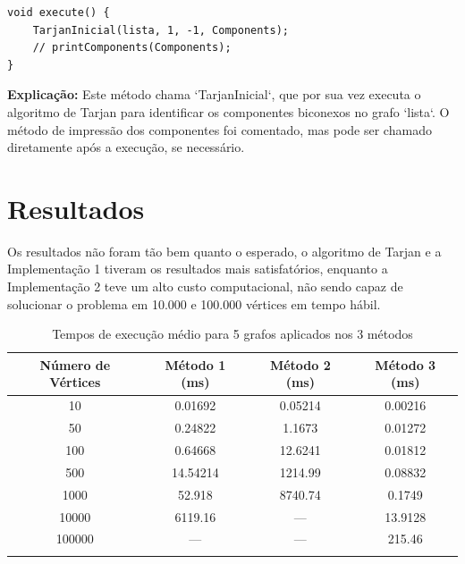 \documentclass[10pt,conference]{IEEEtran}
\begin{document}
\begin{lstlisting}
void execute() {
    TarjanInicial(lista, 1, -1, Components);
    // printComponents(Components);
}
\end{lstlisting}

\textbf{Explicação:} Este método chama `TarjanInicial`, que por sua vez executa o algoritmo de Tarjan para identificar os componentes biconexos no grafo `lista`. O método de impressão dos componentes foi comentado, mas pode ser chamado diretamente após a execução, se necessário.

\section{Resultados}

Os resultados não foram tão bem quanto o esperado, o algoritmo de Tarjan e a Implementação 1 tiveram os resultados mais satisfatórios, enquanto a Implementação 2 teve um alto custo computacional, não sendo capaz de solucionar o problema em 10.000 e 100.000 vértices em tempo hábil.

\begin{longtable}{|c|c|c|c|}
    \hline
    Número de Vértices & Método 1 (ms) & Método 2 (ms) & Método 3 (ms) \\ \hline10 & 0.01692 & 0.05214 & 0.00216 \\ \hline
          50 & 0.24822 & 1.1673 & 0.01272 \\ \hline
          100 & 0.64668 & 12.6241 & 0.01812 \\ \hline
          500 & 14.54214 & 1214.99 & 0.08832 \\ \hline
          1000 & 52.918 & 8740.74 & 0.1749 \\ \hline
          10000 & 6119.16 & --- & 13.9128 \\ \hline
          100000 & --- & --- & 215.46 \\ \hline
    
\caption{Tempos de execução médio para 5 grafos aplicados nos 3 métodos}
\end{longtable}

\newpage
\end{document}
